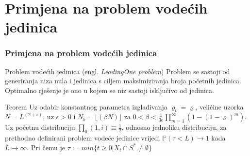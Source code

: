 \documentclass{beamer}
\newcommand{\floor}[1]{\lfloor #1 \rfloor}
\begin{document}
\appendix

\section{Primjena na problem vodećih jedinica}
\begin{frame}
\frametitle{Primjena na problem vodećih jedinica}
\begin{block}{Problem vodećih jedinica (engl. \textit{LeadingOne problem})}
  Problem se sastoji od generiranja niza nula i jedinica s ciljem maksimiziranja broja početnih jedinica. Optimalno rješenje je ono u kojem se niz sastoji isključivo od jedinica.
  \end{block}

  \begin{block}{Teorem}
    Uz odabir konstantnog parametra izglađivanja $\varrho_t = \varrho$, veličine uzorka $N = L^{(2 + \epsilon)}$, uz $\epsilon > 0$
    i $N_b =  \floor{(\beta N)}$ za
    $0 < \beta < \frac{1}{3e} \prod^{\infty}_{m=1} (1 - (1 - \varrho)^m)$. Uz početnu distribuciju
    $\prod_0(1, i) \equiv \frac{1}{2}$, odnosno jednoliku distribuciju, za prethodno definirani
  problem vodeće jedinice vrijedi $\mathbb{P}(\tau < L) \rightarrow 1$ kada $L \rightarrow \infty$.
  Pri čemu je $\tau := min \{ t \geq 0 | X_t \cap S^* \neq \emptyset \}$
    \end{block}
\end{frame}
\end{document}
